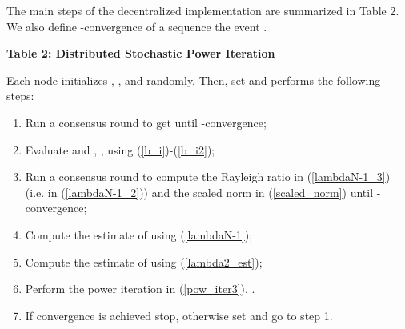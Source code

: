 \documentclass[10pt,twocolumn]{IEEEtran}
\begin{document}
The main steps of the decentralized implementation are summarized in Table 2. We also define -convergence of a sequence  the event .

\begin{algorithm}
\caption*{\textbf{Table 2: Distributed Stochastic Power Iteration}}

\vspace{.2cm}
Each node initializes , , and  randomly. Then, set  and performs the following steps:

\begin{enumerate}
  \item Run a consensus round to get  until -convergence;
  \item Evaluate  and , , using (\ref{b_i})-(\ref{b_i2});
  \item Run a consensus round to compute the Rayleigh ratio in (\ref{lambdaN-1_3}) (i.e.  in (\ref{lambdaN-1_2})) and the scaled norm in (\ref{scaled_norm}) until -convergence;
  \item Compute the estimate  of  using (\ref{lambdaN-1});
  \item Compute the estimate  of  using (\ref{lambda2_est});
  \item Perform the power iteration in (\ref{pow_iter3}), .
  \item If convergence is achieved stop, otherwise set  and go to step 1.
\end{enumerate}
\end{algorithm}
\end{document}
